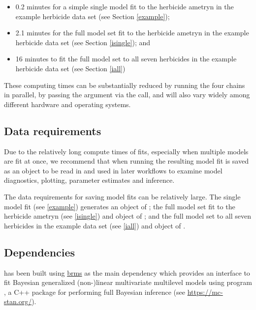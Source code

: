 \documentclass[
  shortnames]{jss}
\begin{document}
\begin{itemize}
\item
  0.2 minutes for a simple single model fit to the herbicide ametryn in the example herbicide data set (see Section \ref{example});
\item
  2.1 minutes for the full  model set fit to the herbicide ametryn in the example herbicide data set (see Section \ref{isingle}); and
\item
  16 minutes to fit the full  model set to all seven herbicides in the example herbicide data set (see Section \ref{iall})
\end{itemize}

These computing times can be substantially reduced by running the four chains in parallel, by passing the argument  via the  call, and will also vary widely among different hardware and operating systems.

\hypertarget{data-requirements}{%
\subsection{Data requirements}\label{data-requirements}}

Due to the relatively long compute times of  fits, especially when multiple models are fit at once, we recommend that when running  the resulting model fit is saved as an  object to be read in and used in later workflows to examine model diagnostics, plotting, parameter estimates and inference.

The data requirements for saving model fits can be relatively large. The single model fit (see \ref{example}) generates an object of ; the full  model set fit to the herbicide ametryn (see \ref{isingle}) and object of ; and the full  model set to all seven herbicides in the example data set (see \ref{iall}) and object of .

\hypertarget{dependencies}{%
\subsection{Dependencies}\label{dependencies}}

 has been built using
\href{https://github.com/paul-buerkner/brms}{brms} \citep{Burkner2017} as the main dependency which provides an interface to fit Bayesian generalized
(non-)linear multivariate multilevel models using  program \citep{stan2021}, a C++ package
for performing full Bayesian inference (see \url{https://mc-stan.org/}).
\end{document}
